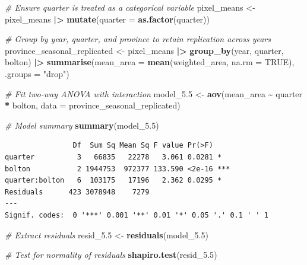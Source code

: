 \documentclass[
  british,
  10pt,
]{article}
\newenvironment{Shaded}{\begin{snugshade}}{\end{snugshade}}
\newcommand{\AttributeTok}[1]{\textcolor[rgb]{0.13,0.29,0.53}{#1}}
\newcommand{\CommentTok}[1]{\textcolor[rgb]{0.56,0.35,0.01}{\textit{#1}}}
\newcommand{\ConstantTok}[1]{\textcolor[rgb]{0.56,0.35,0.01}{#1}}
\newcommand{\FloatTok}[1]{\textcolor[rgb]{0.00,0.00,0.81}{#1}}
\newcommand{\FunctionTok}[1]{\textcolor[rgb]{0.13,0.29,0.53}{\textbf{#1}}}
\newcommand{\NormalTok}[1]{#1}
\newcommand{\OtherTok}[1]{\textcolor[rgb]{0.56,0.35,0.01}{#1}}
\newcommand{\SpecialCharTok}[1]{\textcolor[rgb]{0.81,0.36,0.00}{\textbf{#1}}}
\newcommand{\StringTok}[1]{\textcolor[rgb]{0.31,0.60,0.02}{#1}}
\begin{document}
\begin{Shaded}
\begin{Highlighting}[]
\CommentTok{\# Ensure quarter is treated as a categorical variable}
\NormalTok{pixel\_means }\OtherTok{\textless{}{-}}\NormalTok{ pixel\_means }\SpecialCharTok{|\textgreater{}}
  \FunctionTok{mutate}\NormalTok{(}\AttributeTok{quarter =} \FunctionTok{as.factor}\NormalTok{(quarter))}

\CommentTok{\# Group by year, quarter, and province to retain replication across years}
\NormalTok{province\_seasonal\_replicated }\OtherTok{\textless{}{-}}\NormalTok{ pixel\_means }\SpecialCharTok{|\textgreater{}}
  \FunctionTok{group\_by}\NormalTok{(year, quarter, bolton) }\SpecialCharTok{|\textgreater{}}
  \FunctionTok{summarise}\NormalTok{(}\AttributeTok{mean\_area =} \FunctionTok{mean}\NormalTok{(weighted\_area, }\AttributeTok{na.rm =} \ConstantTok{TRUE}\NormalTok{), }\AttributeTok{.groups =} \StringTok{"drop"}\NormalTok{)}

\CommentTok{\# Fit two{-}way ANOVA with interaction}
\NormalTok{model\_5}\FloatTok{.5} \OtherTok{\textless{}{-}} \FunctionTok{aov}\NormalTok{(mean\_area }\SpecialCharTok{\textasciitilde{}}\NormalTok{ quarter }\SpecialCharTok{*}\NormalTok{ bolton, }\AttributeTok{data =}\NormalTok{ province\_seasonal\_replicated)}

\CommentTok{\# Model summary}
\FunctionTok{summary}\NormalTok{(model\_5}\FloatTok{.5}\NormalTok{)}
\end{Highlighting}
\end{Shaded}

\begin{verbatim}
                Df  Sum Sq Mean Sq F value Pr(>F)    
quarter          3   66835   22278   3.061 0.0281 *  
bolton           2 1944753  972377 133.590 <2e-16 ***
quarter:bolton   6  103175   17196   2.362 0.0295 *  
Residuals      423 3078948    7279                   
---
Signif. codes:  0 '***' 0.001 '**' 0.01 '*' 0.05 '.' 0.1 ' ' 1
\end{verbatim}

\begin{Shaded}
\begin{Highlighting}[]
\CommentTok{\# Extract residuals}
\NormalTok{resid\_5}\FloatTok{.5} \OtherTok{\textless{}{-}} \FunctionTok{residuals}\NormalTok{(model\_5}\FloatTok{.5}\NormalTok{)}

\CommentTok{\# Test for normality of residuals}
\FunctionTok{shapiro.test}\NormalTok{(resid\_5}\FloatTok{.5}\NormalTok{)}
\end{Highlighting}
\end{Shaded}
\end{document}
